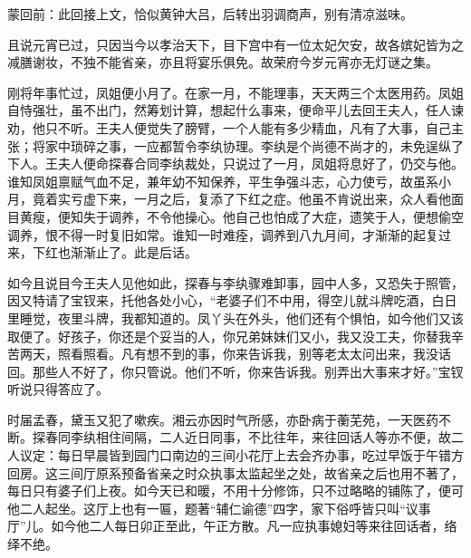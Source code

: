 
\begin{parag}

    \begin{note}蒙回前：此回接上文，恰似黄钟大吕，后转出羽调商声，别有清凉滋味。\end{note}
\end{parag}


\begin{parag}


    且说元宵已过，只因当今以孝治天下，目下宫中有一位太妃欠安，故各嫔妃皆为之减膳谢妆，不独不能省亲，亦且将宴乐俱免。故荣府今岁元宵亦无灯谜之集。
\end{parag}


\begin{parag}


    刚将年事忙过，凤姐便小月了。在家一月，不能理事，天天两三个太医用药。凤姐自恃强壮，虽不出门，然筹划计算，想起什么事来，便命平儿去回王夫人，任人谏劝，他只不听。王夫人便觉失了膀臂，一个人能有多少精血，凡有了大事，自己主张；将家中琐碎之事，一应都暂令李纨协理。李纨是个尚德不尚才的，未免逞纵了下人。王夫人便命探春合同李纨裁处，只说过了一月，凤姐将息好了，仍交与他。谁知凤姐禀赋气血不足，兼年幼不知保养，平生争强斗志，心力使亏，故虽系小月，竟着实亏虚下来，一月之后，复添了下红之症。他虽不肯说出来，众人看他面目黄瘦，便知失于调养，不令他操心。他自己也怕成了大症，遗笑于人，便想偷空调养，恨不得一时复旧如常。谁知一时难痊，调养到八九月间，才渐渐的起复过来，下红也渐渐止了。此是后话。
\end{parag}


\begin{parag}


    如今且说目今王夫人见他如此，探春与李纨骤难卸事，园中人多，又恐失于照管，因又特请了宝钗来，托他各处小心，“老婆子们不中用，得空儿就斗牌吃酒，白日里睡觉，夜里斗牌，我都知道的。凤丫头在外头，他们还有个惧怕，如今他们又该取便了。好孩子，你还是个妥当的人，你兄弟妹妹们又小，我又没工夫，你替我辛苦两天，照看照看。凡有想不到的事，你来告诉我，别等老太太问出来，我没话回。那些人不好了，你只管说。他们不听，你来告诉我。别弄出大事来才好。”宝钗听说只得答应了。
\end{parag}


\begin{parag}


    时届孟春，黛玉又犯了嗽疾。湘云亦因时气所感，亦卧病于蘅芜苑，一天医药不断。探春同李纨相住间隔，二人近日同事，不比往年，来往回话人等亦不便，故二人议定：每日早晨皆到园门口南边的三间小花厅上去会齐办事，吃过早饭于午错方回房。这三间厅原系预备省亲之时众执事太监起坐之处，故省亲之后也用不著了，每日只有婆子们上夜。如今天已和暖，不用十分修饰，只不过略略的铺陈了，便可他二人起坐。这厅上也有一匾，题著“辅仁谕德”四字，家下俗呼皆只叫“议事厅”儿。如今他二人每日卯正至此，午正方散。凡一应执事媳妇等来往回话者，络绎不绝。
\end{parag}


